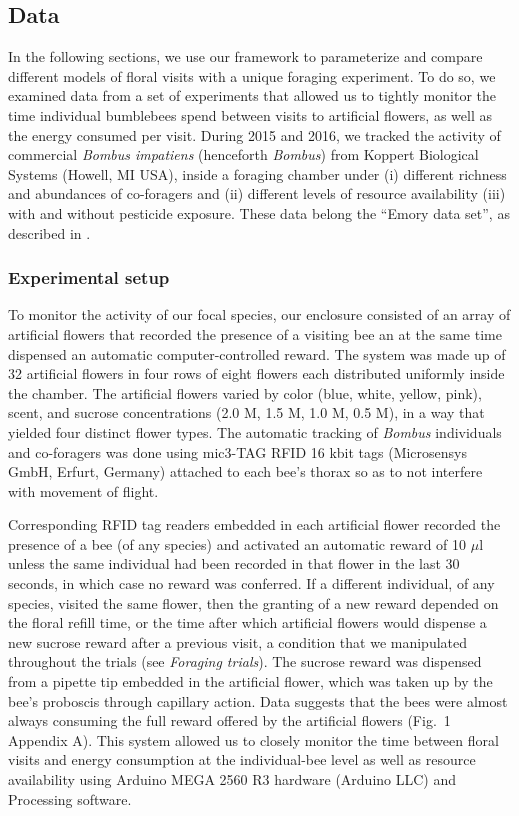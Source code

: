 \begin{refsection}
\subsection*{Data}

In the following sections, we use our framework to parameterize and compare different models of floral visits with a unique foraging experiment. To do so, we examined data from a set of experiments that allowed us to tightly monitor the time  individual bumblebees spend between visits to artificial flowers, as well as the energy consumed per visit. During 2015 and 2016, we tracked the activity of commercial \textit{Bombus impatiens} (henceforth \textit{Bombus}) from Koppert Biological Systems (Howell, MI USA), inside a foraging chamber under (i) different richness and abundances of co-foragers and (ii) different levels of resource availability (iii) with and without pesticide exposure. These data  belong the ``Emory data set'', as described in \citet{ayers_statistically_2018}.

\subsubsection*{Experimental setup}

To monitor the activity of our focal species, our enclosure consisted of an array of artificial flowers that recorded the presence of a visiting bee an at the same time dispensed an automatic computer-controlled reward. The system was made up of 32 artificial flowers in four rows of eight flowers each distributed uniformly inside the chamber. The artificial flowers varied by color (blue, white, yellow, pink), scent, and sucrose concentrations (2.0 M, 1.5 M, 1.0 M, 0.5 M), in a way that yielded four distinct flower types. The automatic tracking of \textit{Bombus} individuals and co-foragers was done using mic3-TAG RFID 16 kbit tags (Microsensys GmbH, Erfurt, Germany) attached to each bee's thorax so as to not interfere with movement of flight.

Corresponding RFID tag readers embedded in each artificial flower recorded the presence of a bee (of any species) and activated an automatic reward of  10 $\mu$l unless the same individual had been recorded in that flower in the last 30 seconds, in which case no reward was conferred. If a different individual, of any species, visited the same flower, then the granting of a new reward depended on the floral refill time, or the time after which artificial flowers would dispense a new sucrose reward after a previous visit, a condition that we manipulated throughout the trials (see \textit{Foraging trials}). The sucrose reward was dispensed from a pipette tip embedded in the artificial flower, which was taken up by the bee’s proboscis through capillary action. Data suggests that the bees were almost always consuming the full reward offered by the artificial flowers (Fig.~1 Appendix A). This system allowed us to closely monitor the time between floral visits and energy consumption at the individual-bee level as well as resource availability using Arduino MEGA 2560 R3 hardware (Arduino LLC) and Processing software.



\end{refsection}
